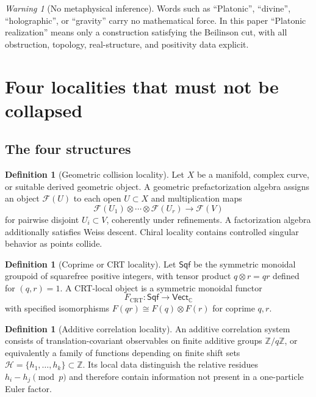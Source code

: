\documentclass[11pt]{article}
\theoremstyle{definition}
\newtheorem{definition}[theorem]{Definition}
\theoremstyle{remark}
\newtheorem{warning}[theorem]{Warning}
\newcommand{\ZZ}{\mathbb Z}
\newcommand{\CC}{\mathbb C}
\newcommand{\1}{\mathbf 1}
\newcommand{\cH}{\mathcal H}
\begin{document}
\begin{warning}[No metaphysical inference]
Words such as ``Platonic'', ``divine'', ``holographic'', or ``gravity'' carry no mathematical force.  In this paper ``Platonic realization'' means only a construction satisfying the Beilinson cut, with all obstruction, topology, real-structure, and positivity data explicit.
\end{warning}

\section{Four localities that must not be collapsed}

\subsection{The four structures}

\begin{definition}[Geometric collision locality]
Let $X$ be a manifold, complex curve, or suitable derived geometric object.  A geometric prefactorization algebra assigns an object $\mathcal F(U)$ to each open $U\subset X$ and multiplication maps
\[
\mathcal F(U_1)\otimes\cdots\otimes\mathcal F(U_r)\longrightarrow \mathcal F(V)
\]
for pairwise disjoint $U_i\subset V$, coherently under refinements.  A factorization algebra additionally satisfies Weiss descent.  Chiral locality contains controlled singular behavior as points collide.
\end{definition}

\begin{definition}[Coprime or CRT locality]
Let $\mathsf{Sqf}$ be the symmetric monoidal groupoid of squarefree positive integers, with tensor product $q\otimes r=qr$ defined for $(q,r)=1$.  A CRT-local object is a symmetric monoidal functor
\[
F_{\mathrm{CRT}}:\mathsf{Sqf}\longrightarrow \mathsf{Vect}_{\CC}
\]
with specified isomorphisms $F(qr)\cong F(q)\otimes F(r)$ for coprime $q,r$.
\end{definition}

\begin{definition}[Additive correlation locality]
An additive correlation system consists of translation-covariant observables on finite additive groups $\ZZ/q\ZZ$, or equivalently a family of functions depending on finite shift sets $\cH=\{h_1,\ldots,h_k\}\subset\ZZ$.  Its local data distinguish the relative residues $h_i-h_j\pmod p$ and therefore contain information not present in a one-particle Euler factor.
\end{definition}
\end{document}
